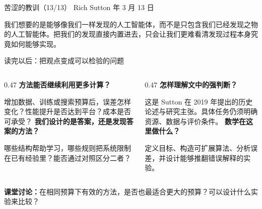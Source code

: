 \documentclass[UTF8,aspectratio=169,11pt,fontset=none]{ctexbeamer}
\newcommand{\head}[1]{{\color{accent}\bfseries #1}\par\vspace{0.07cm}}
\newcommand{\takeaway}[1]{\begin{tcolorbox}[enhanced,colback=paper,colframe=paper,boxrule=0pt,arc=1.5mm,left=2.5mm,right=2.5mm,top=1.7mm,bottom=1.7mm,before skip=2mm,after skip=1mm]\small #1\end{tcolorbox}}
\begin{document}
\begin{frame}[t]{苦涩的教训（13/13）}
\relax
{\small\color{accent}Rich Sutton 年 3 月 13 日}\par
\vspace{0.22cm}
\begingroup
\fontsize{12}{20}\selectfont
我们想要的是能够像我们一样发现的人工智能体，而不是只包含我们已经发现之物的人工智能体。把我们的发现直接内置进去，只会让我们更难看清发现过程本身究竟如何能够实现。
\par\endgroup
\end{frame}

\begin{frame}{读完以后：把观点变成可以检验的问题}
\begin{columns}[T,onlytextwidth]
\begin{column}{0.47\textwidth}
\head{方法能否继续利用更多计算？}
增加数据、训练或搜索预算后，误差怎样变化？性能提升是否达到平台？成本是否可承受？
\vspace{0.16cm}
\head{我们设计的是答案，还是发现答案的方法？}
哪些结构帮助学习，哪些规则把系统限制在已有经验里？能否通过对照区分二者？
\end{column}
\begin{column}{0.47\textwidth}
\head{怎样理解文中的强判断？}
这是 Sutton 在 2019 年提出的历史论述与研究主张。具体任务仍须明确资源、数据与评价条件。
\vspace{0.16cm}
\head{数学在这里做什么？}
定义目标、构造可扩展算法、分析误差，并设计能够推翻错误解释的实验。
\end{column}
\end{columns}
\takeaway{\textbf{课堂讨论：}在相同预算下有效的方法，是否也最适合更大的预算？可以设计什么实验来比较？}
\end{frame}
\end{document}
